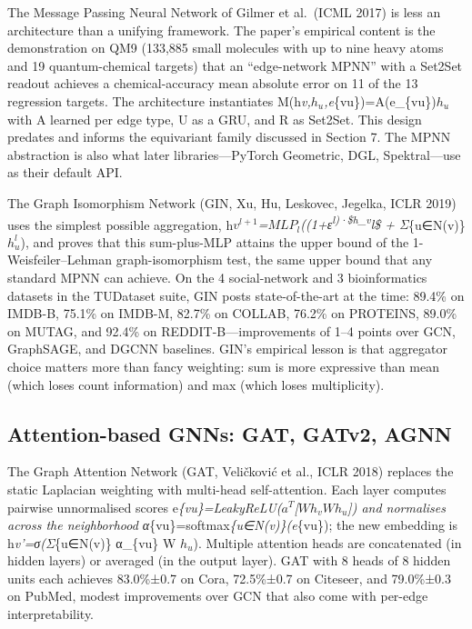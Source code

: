 The Message Passing Neural Network of Gilmer et al.~(ICML 2017) is less an architecture than a unifying framework. The paper's empirical content is the demonstration on QM9 (133,885 small molecules with up to nine heavy atoms and 19 quantum-chemical targets) that an ``edge-network MPNN'' with a Set2Set readout achieves a chemical-accuracy mean absolute error on 11 of the 13 regression targets. The architecture instantiates M(h\emph{v,\(h_u\),e}\{vu\})=A(e\_\{vu\})\(h_u\) with A learned per edge type, U as a GRU, and R as Set2Set. This design predates and informs the equivariant family discussed in Section 7. The MPNN abstraction is also what later libraries---PyTorch Geometric, DGL, Spektral---use as their default API.

The Graph Isomorphism Network (GIN, Xu, Hu, Leskovec, Jegelka, ICLR 2019) uses the simplest possible aggregation, h\emph{\(v^{l+1}\)=\(MLP_l\)((1+ε\textsuperscript{l)·\$h\_v}l\$ + Σ}\{u∈N(v)\} \(h_u^l\)), and proves that this sum-plus-MLP attains the upper bound of the 1-Weisfeiler--Lehman graph-isomorphism test, the same upper bound that any standard MPNN can achieve. On the 4 social-network and 3 bioinformatics datasets in the TUDataset suite, GIN posts state-of-the-art at the time: 89.4\% on IMDB-B, 75.1\% on IMDB-M, 82.7\% on COLLAB, 76.2\% on PROTEINS, 89.0\% on MUTAG, and 92.4\% on REDDIT-B---improvements of 1--4 points over GCN, GraphSAGE, and DGCNN baselines. GIN's empirical lesson is that aggregator choice matters more than fancy weighting: sum is more expressive than mean (which loses count information) and max (which loses multiplicity).

\subsection{Attention-based GNNs: GAT, GATv2, AGNN}\label{attention-based-gnns-gat-gatv2-agnn}

The Graph Attention Network (GAT, Veličković et al., ICLR 2018) replaces the static Laplacian weighting with multi-head self-attention. Each layer computes pairwise unnormalised scores e\emph{\{vu\}=LeakyReLU(\(a^T\){[}\(Wh_v\)\textbar\textbar{}\(Wh_u\){]}) and normalises across the neighborhood α}\{vu\}=softmax\emph{\{u∈N(v)\}(e}\{vu\}); the new embedding is h\emph{v'=σ(Σ}\{u∈N(v)\} α\_\{vu\} W \(h_u\)). Multiple attention heads are concatenated (in hidden layers) or averaged (in the output layer). GAT with 8 heads of 8 hidden units each achieves 83.0\%±0.7 on Cora, 72.5\%±0.7 on Citeseer, and 79.0\%±0.3 on PubMed, modest improvements over GCN that also come with per-edge interpretability.

